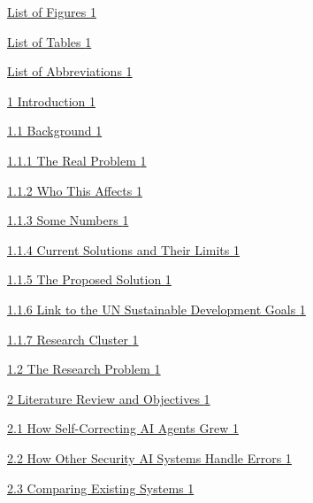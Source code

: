 \documentclass[
]{article}
\begin{document}
\protect\hyperlink{list-of-figures}{List of Figures
\protect\hyperlink{list-of-figures}{1}}

\protect\hyperlink{list-of-tables}{List of Tables
\protect\hyperlink{list-of-tables}{1}}

\protect\hyperlink{list-of-abbreviations}{List of Abbreviations
\protect\hyperlink{list-of-abbreviations}{1}}

\protect\hyperlink{introduction}{1 Introduction
\protect\hyperlink{introduction}{1}}

\protect\hyperlink{background}{1.1 Background
\protect\hyperlink{background}{1}}

\protect\hyperlink{the-real-problem}{1.1.1 The Real Problem
\protect\hyperlink{the-real-problem}{1}}

\protect\hyperlink{who-this-affects}{1.1.2 Who This Affects
\protect\hyperlink{who-this-affects}{1}}

\protect\hyperlink{some-numbers}{1.1.3 Some Numbers
\protect\hyperlink{some-numbers}{1}}

\protect\hyperlink{current-solutions-and-their-limits}{1.1.4 Current
Solutions and Their Limits
\protect\hyperlink{current-solutions-and-their-limits}{1}}

\protect\hyperlink{the-proposed-solution}{1.1.5 The Proposed Solution
\protect\hyperlink{the-proposed-solution}{1}}

\protect\hyperlink{link-to-the-un-sustainable-development-goals}{1.1.6
Link to the UN Sustainable Development Goals
\protect\hyperlink{link-to-the-un-sustainable-development-goals}{1}}

\protect\hyperlink{research-cluster}{1.1.7 Research Cluster
\protect\hyperlink{research-cluster}{1}}

\protect\hyperlink{the-research-problem}{1.2 The Research Problem
\protect\hyperlink{the-research-problem}{1}}

\protect\hyperlink{literature-review-and-objectives}{2 Literature Review
and Objectives \protect\hyperlink{literature-review-and-objectives}{1}}

\protect\hyperlink{how-self-correcting-ai-agents-grew}{2.1 How
Self-Correcting AI Agents Grew
\protect\hyperlink{how-self-correcting-ai-agents-grew}{1}}

\protect\hyperlink{how-other-security-ai-systems-handle-errors}{2.2 How
Other Security AI Systems Handle Errors
\protect\hyperlink{how-other-security-ai-systems-handle-errors}{1}}

\protect\hyperlink{comparing-existing-systems}{2.3 Comparing Existing
Systems \protect\hyperlink{comparing-existing-systems}{1}}
\end{document}

